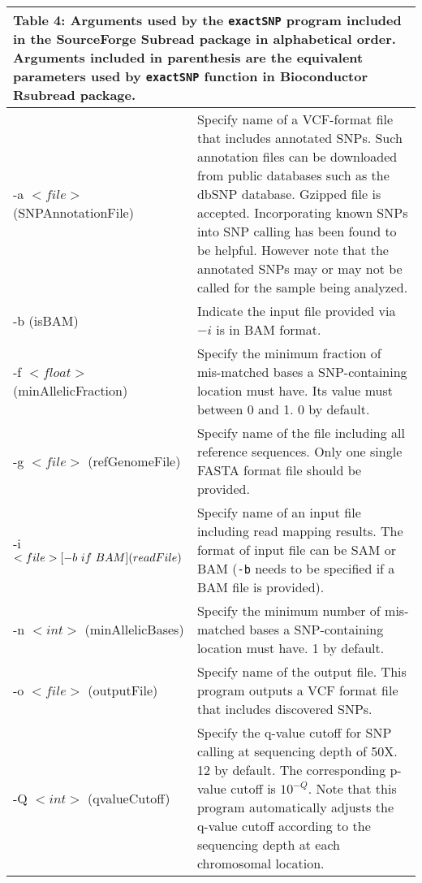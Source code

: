 \documentclass[12pt]{report}
\newcommand{\code}[1]{{\small\texttt{#1}}}
\newcommand{\Subread}{\textsf{Subread}}
\newcommand{\Rsubread}{\textsf{Rsubread}}
\begin{document}
\begin{longtable}{|p{4.5cm}|p{11cm}|}
\multicolumn{2}{p{16cm}}{Table 4: Arguments used by the \code{exactSNP} program included in the SourceForge {\Subread} package in alphabetical order.
Arguments included in parenthesis are the equivalent parameters used by \code{exactSNP} function in Bioconductor {\Rsubread} package.}
\endfirsthead
\hline
Arguments & Description \\
\hline
-a $<file>$ \newline (SNPAnnotationFile) & Specify name of a VCF-format file that includes annotated SNPs. Such annotation files can be downloaded from public databases such as the dbSNP database. Gzipped file is accepted. Incorporating known SNPs into SNP calling has been found to be helpful. However note that the annotated SNPs may or may not be called for the sample being analyzed. \\
\hline
-b \newline (isBAM) & Indicate the input file provided via $-i$ is in BAM format. \\
\hline
-f $<float>$ \newline (minAllelicFraction) & Specify the minimum fraction of mis-matched bases a SNP-containing location must have. Its value must between 0 and 1. 0 by default. \\
\hline
-g $<file>$ \newline (refGenomeFile) & Specify name of the file including all reference sequences. Only one single FASTA format file should be provided. \\
\hline
-i $<file> [-b\ if\ BAM] \newline (readFile)$ & Specify name of an input file including read mapping results. The format of input file can be SAM or BAM  (\code{-b} needs to be specified if a BAM file is provided).\\
\hline
-n $<int>$ \newline (minAllelicBases) & Specify the minimum number of mis-matched bases a SNP-containing location must have. 1 by default.\\
\hline
-o $<file>$ \newline (outputFile) & Specify name of the output file. This program outputs a VCF format file that includes discovered SNPs. \\
\hline
-Q $<int>$  \newline (qvalueCutoff) &  Specify the q-value cutoff for SNP calling at sequencing depth of 50X. 12 by default. The corresponding p-value cutoff is $10^{-Q}$. Note that this program automatically adjusts the q-value cutoff according to the sequencing depth at each chromosomal location.\\

\end{longtable}
\end{document}

